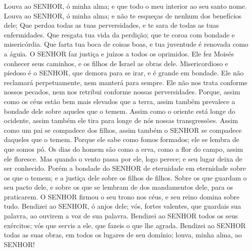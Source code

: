 
{\PP 
  Louva ao SENHOR, ó minha alma; e que todo o meu interior
{} ao seu santo nome.
  Louva ao SENHOR, ó minha alma; e não te esqueças de nenhum dos benefícios dele;
  Que perdoa todas as tuas perversidades, e te sara de todas as tuas enfermidades.
  Que resgata tua vida da perdição; que te coroa com bondade e misericórdia.
  Que farta tua boca de coisas boas, e tua juventude é renovada como a águia.
  O SENHOR faz justiça e juízos a todos os oprimidos.
  Ele fez Moisés conhecer seus caminhos, e os filhos de Israel
{} as obras dele.
  Misericordioso e piedoso é o SENHOR, que demora para se irar, e é grande em bondade.
  Ele não reclamará perpetuamente, nem manterá
{} para sempre.
  Ele não nos trata conforme nossos pecados, nem nos retribui conforme nossas perversidades.
  Porque, assim como os céus estão bem mais elevados que a terra, assim também prevalece a bondade dele sobre aqueles que o temem.
  Assim como o oriente está longe do ocidente, assim também ele tira para longe de nós nossas transgressões.
  Assim como um pai se compadece dos filhos, assim também o SENHOR se compadece daqueles que o temem.
  Porque ele sabe como fomos formados; ele se lembra de que somos pó.
  Os dias do homem são como a erva, como a flor do campo, assim ele floresce.
  Mas quando o vento passa por ele, logo perece; e seu lugar deixa de ser conhecido.
  Porém a bondade do SENHOR
{} de eternidade em eternidade sobre os que o temem; e a justiça dele
{} sobre os filhos de
{} filhos.
  Sobre os que guardam o seu pacto dele, e sobre os que se lembram de dos mandamentos dele, para os praticarem.
  O SENHOR firmou o seu trono nos céus, e seu reino domina sobre tudo.
  Bendizei ao SENHOR, ó anjos dele; vós, fortes valentes, que guardais sua palavra, ao ouvirem a voz de sua palavra.
  Bendizei ao SENHOR todos os seus exércitos; vós que servis a ele, que fazeis o que lhe agrada.
  Bendizei ao SENHOR todas as suas obras, em todos os lugares de seu domínio; louva, minha alma, ao SENHOR!
\par }

